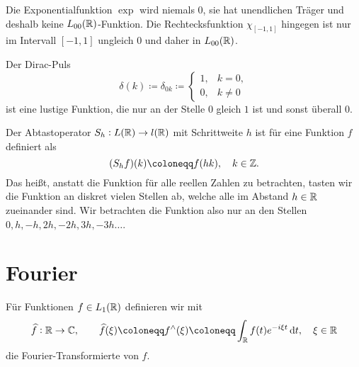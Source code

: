 \begin{example}[$ L_{00}(\R) $-Funktion]
Die Exponentialfunktion $ \exp $ wird niemals $ 0 $, sie hat unendlichen Träger und
deshalb keine $ L_{00}(\R) $-Funktion. Die Rechtecksfunktion $ \chi_{[-1,1]} $ hingegen ist nur
im Intervall $ [-1,1] $ ungleich $ 0 $ und daher in $ L_{00}(\R) $.
\end{example}

\begin{definition}
Der Dirac-Puls
\[
  \delta(k) \coloneqq \delta_{0k} \coloneqq 
  \begin{cases}
    1,& k = 0, \\ 0,& k \neq 0
  \end{cases}
\]
ist eine lustige Funktion, die nur an der Stelle $ 0 $ gleich $ 1 $ ist und sonst überall $ 0 $.
\end{definition}

\begin{definition}[Abtastoperator]
Der Abtastoperator $  S_{h} : L(\mathbb{R}) \rightarrow l(\mathbb{R}) $ mit Schrittweite $ h $ ist für eine
Funktion $ f $ definiert als
\[
  (S_{h}f)(k) \coloneqq f(hk), \quad k \in \Z.
\]
Das heißt, anstatt die Funktion für alle reellen Zahlen zu betrachten, tasten wir die Funktion
an diskret vielen Stellen ab, welche alle im Abstand $ h \in \mathbb{R} $ zueinander sind. Wir betrachten
die Funktion also nur an den Stellen $ 0, h, -h, 2h, -2h, 3h, -3h \dots $.
\end{definition}

\section{Fourier}

\begin{definition}
Für Funktionen $ f \in L_{1}(\mathbb{R}) $ definieren wir mit
\[
  \widehat{f} : \R \rightarrow \C, \qquad
  \widehat{f}(\xi) \coloneqq f^{\wedge}(\xi) \coloneqq 
  \int_{\R} f(t) e^{-i\xi t} \dif t, \quad \xi \in \R
\]
die Fourier-Transformierte von $ f $.
\end{definition}

